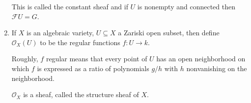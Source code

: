 \begin{enumerate}
		This is called the constant sheaf and if $U$ is nonempty and connected then
		$\mathcal{F}U = G$.

	\item If $X$ is an algebraic variety, $U \subseteq X$ a Zariski open subset, then
		define $\mathcal{O}_X(U)$ to be the regular functions $f\colon U\to k$.

		Roughly, $f$ regular means that every point of $U$ has an open neighborhood
		on which $f$ is expressed as a ratio of polynomials $g/h$ with $h$
		nonvanishing on the neighborhood.

		$\mathcal{O}_X$ is a sheaf, called the structure sheaf of $X$.
\end{enumerate}
